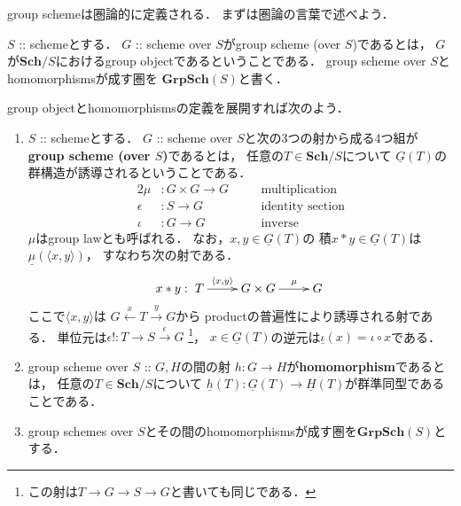 \documentclass[a4paper]{jsarticle}
\newcommand{\Sch}{\mathbf{Sch}}
\newcommand{\GrpSch}{\mathbf{GrpSch}}
\newcommand{\func}[1]{\underline{#1}}
\begin{document}
    group schemeは圏論的に定義される．
    まずは圏論の言葉で述べよう．
    \begin{Def}
        $S$ :: schemeとする．
        $G$ :: scheme over $S$がgroup scheme (over $S$)であるとは，
        $G$が$\Sch/S$におけるgroup objectであるということである．
        group scheme over $S$とhomomorphismsが成す圏を
        $\GrpSch(S)$と書く．
    \end{Def}
    group objectとhomomorphismsの定義を展開すれば次のよう．
    \begin{Def}
    \enumfix
    \begin{enumerate}[label=(\roman*),leftmargin=*]
        \item
        $S$ :: schemeとする．
        $G$ :: scheme over $S$と次の3つの射から成る4つ組が
        \textbf{group scheme (over $S$)}であるとは，
        任意の$T \in \Sch/S$について
        $\func{G}(T)$の群構造が誘導されるということである．
        \begin{alignat*}{2}
            \mu&:       G \times G \to G    && \quad \text{multiplication} \\
            \epsilon&:  S \to G             && \quad \text{identity section}\\
            \iota&:     G \to G             && \quad \text{inverse}
        \end{alignat*}
        $\mu$はgroup lawとも呼ばれる．
        なお，$x, y \in \func{G}(T)$の
        積$x \ast y \in \func{G}(T)$は$\func{\mu}(\langle x, y \rangle)$，
        すなわち次の射である．
        \[
            x \ast y:
        \xymatrix
        {
            T \ar[r]^-{\langle x, y \rangle}& G \times G \ar[r]^-{\mu}& G
        }
        \]
        ここで$\langle x, y \rangle$は
        $G \xleftarrow{x} T \xrightarrow{y} G$から
        productの普遍性により誘導される射である．
        単位元は$\epsilon!: T \to S \xrightarrow{\epsilon} G$
        \footnote{ この射は$T \to G \to S \to G$と書いても同じである． }，
        $x \in \func{G}(T)$の逆元は$\func{\iota}(x)=\iota \circ x$である．

        \item
        group scheme over $S$ :: $G,H$の間の射
        $h: G \to H$が\textbf{homomorphism}であるとは，
        任意の$T \in \Sch/S$について
        $\func{h}(T):\func{G}(T) \to \func{H}(T)$が群準同型であることである．

        \item 
            group schemes over $S$とその間のhomomorphismsが成す圏を\textbf{$\GrpSch(S)$}とする．
    \end{enumerate}
    \end{Def}
\end{document}
